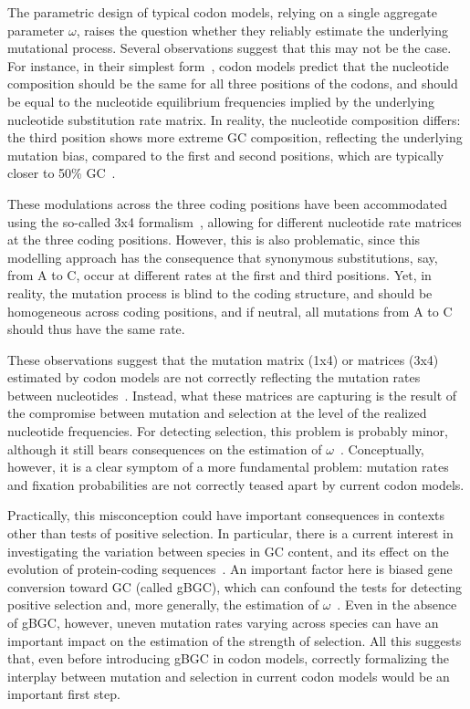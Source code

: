 \documentclass{article}
\begin{document}
The parametric design of typical codon models, relying on a single aggregate parameter $\omega$, raises the question whether they reliably estimate the underlying mutational process.
Several observations suggest that this may not be the case.
For instance, in their simplest form~\citep{Muse1994, Goldman1994}, codon models predict that the nucleotide composition should be the same for all three positions of the codons, and should be equal to the nucleotide equilibrium frequencies implied by the underlying nucleotide {substitution} rate matrix.
In reality, the nucleotide composition differs: the third position shows more extreme GC composition, reflecting the underlying mutation bias, compared to the first and second positions, which are typically closer to 50\% GC~\citep{Singer2000}.

These modulations across the three coding positions have been accommodated using the so-called 3x4 formalism~\citep{Goldman1994, Pond2005a}, allowing for different nucleotide rate matrices at the three coding positions.
However, this is also problematic, since this modelling approach has the consequence that {synonymous} {substitutions}, say, from A to C, occur at different rates at the first and third positions.
Yet, in reality, the mutation process is blind to the coding structure, and should be homogeneous across coding positions, and if {neutral}, all mutations from A to C should thus have the same rate.

These observations suggest that the mutation matrix (1x4) or matrices (3x4) estimated by codon models are not correctly reflecting the mutation rates between nucleotides~\citep{Rodrigue2008a}.
Instead, what these matrices are capturing is the result of the compromise between mutation and selection at the level of the realized nucleotide frequencies.
For detecting selection, this problem is probably minor, although it still bears consequences on the estimation of $\omega$~\citep{Spielman2015}.
Conceptually, however, it is a clear symptom of a more fundamental problem: mutation rates and fixation probabilities are not correctly teased apart by current codon models.

Practically, this misconception could have important consequences in contexts other than tests of positive selection.
In particular, there is a current interest in investigating the variation between species in GC content, and its effect on the evolution of protein-coding sequences~\citep{Bolivar2019}.
An important factor here is biased gene conversion toward GC (called {gBGC}), which can confound the tests for detecting positive selection and, more generally, the estimation of $\omega$~\citep{Galtier2009,Ratnakumar2010, Figuet2014}.
Even in the absence of {gBGC}, however, uneven mutation rates varying across species can have an important impact on the estimation of the strength of selection.
All this suggests that, even before introducing {gBGC} in codon models, correctly formalizing the interplay between mutation and selection in current codon models would be an important first step.
\end{document}
